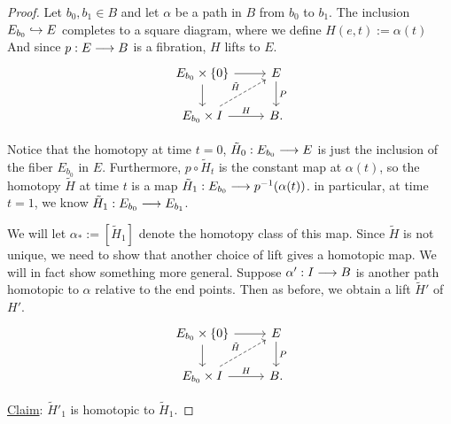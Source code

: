 \documentclass[11pt]{book} %
\begin{document}
\begin{proof}
Let $b_0, b_1\in B$ and let $\alpha$ be a path in $B$ from $b_0$ to $b_1$. The inclusion $E_{b_0}\hookrightarrow E$ completes to a square diagram, where we define $H(e,t):=\alpha(t)$ And since $p: E\longrightarrow B$ is a fibration, $H$ lifts to $E$.
$$
\begin{tikzcd}
E_{b_0}\times \{0\} \arrow[d] \arrow[r] & E \arrow[d, "P"] \\
E_{b_0}\times I \arrow[r, "H"] \arrow[ru, "\tilde{H}", dashed] & B.
\end{tikzcd}
$$

Notice that the homotopy at time $t=0$, $\tilde{H}_0: E_{b_0}\longrightarrow E$ is just the inclusion of the fiber $E_{b_0}$ in $E$. Furthermore, $p\circ \tilde{H}_t$ is the constant map at $\alpha(t)$, so the homotopy $\tilde{H}$ at time $t$ is a map $\tilde{H}_1: E_{b_0}\longrightarrow p^{-1}(\alpha(t))$. in particular, at time $t=1$, we know $\tilde{H}_1: E_{b_0}\longrightarrow E_{b_1}$.

We will let $\alpha_*:=[\tilde{H}_1]$ denote the homotopy class of this map. Since $\tilde{H}$ is not unique, we need to show that another choice of lift gives a homotopic map. We will in fact show something more general. Suppose $\alpha': I\longrightarrow B$ is another path homotopic to $\alpha$ relative to the end points. Then as before, we obtain a lift $\tilde{H}'$ of $H'$.
$$
\begin{tikzcd}
E_{b_0}\times \{0\} \arrow[d] \arrow[r] & E \arrow[d, "P"] \\
E_{b_0}\times I \arrow[r, "H"] \arrow[ru, "\tilde{H}", dashed] & B.
\end{tikzcd}
$$

\underline{Claim}: $\tilde{H}'_1$ is homotopic to $\tilde{H}_1$.


\end{proof}
\end{document}
